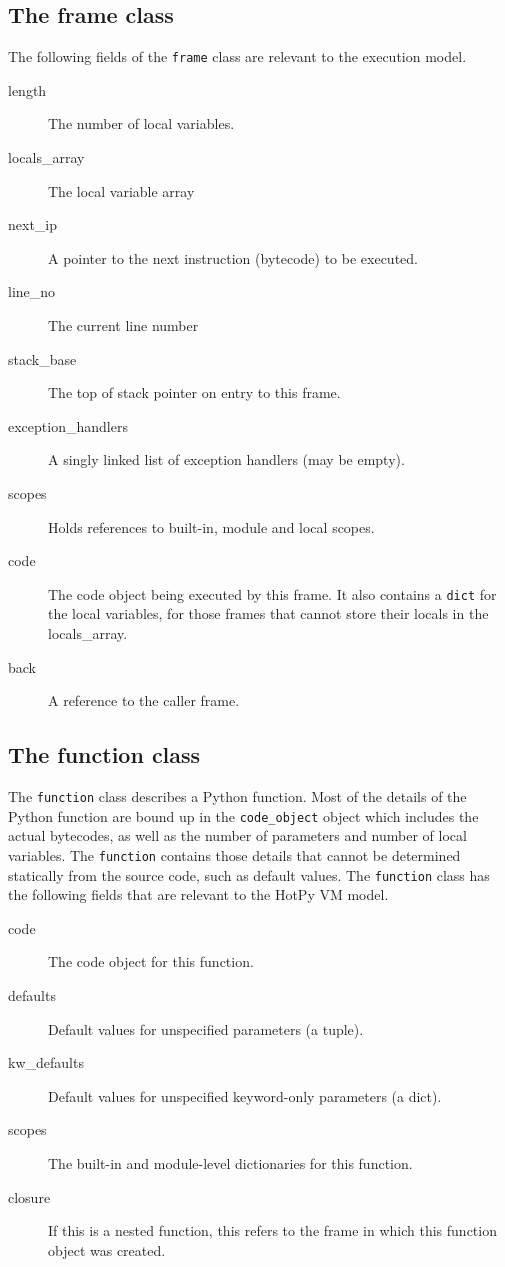 \documentclass[a4paper,10pt]{article}
\begin{document}
\subsection{The frame class}

The following fields of the \verb|frame| class are relevant to the execution model.
\begin{description}
\item[length] The number of local variables.
\item[locals\_array] The local variable array
\item[next\_ip] A pointer to the next instruction (bytecode) to be executed.
\item[line\_no] The current line number
\item[stack\_base] The top of stack pointer on entry to this frame. 
\item[exception\_handlers]  A singly linked list of exception handlers (may be empty).
\item[scopes] Holds references to built-in, module and local scopes.
\item[code] The code object being executed by this frame.
It also contains a \verb|dict| for the local variables, for those frames that cannot store their locals in the locals\_array.
\item[back] A reference to the caller frame.
\end{description}

\subsection{The function class}

The \verb|function| class describes a Python function. Most of the details of the  Python function are bound up in the \verb|code_object| object which includes the actual bytecodes, as well as the number of parameters and number of local variables. The \verb|function| contains those details that cannot be determined statically from the source code, such as default values.
The \verb|function| class has the following fields that are relevant to the HotPy VM model.
\begin{description}
\item[code] The code object for this function.
\item[defaults] Default values for unspecified parameters (a tuple).
\item[kw\_defaults] Default values for unspecified keyword-only parameters (a dict).
\item[scopes] The built-in and module-level dictionaries for this function.
\item[closure] If this is a nested function, this refers to the frame in which this function object was created.
\end{description}
\end{document}
